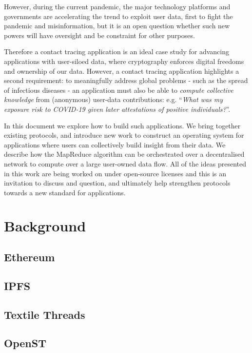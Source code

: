 \documentclass[twoside,twocolumn]{article}
\begin{document}
However, during the current pandemic, the major technology platforms and governments are accelerating the trend to exploit user data, first to fight the pandemic and misinformation, but it is an open question whether such new powers will have oversight and be constraint for other purposes.

Therefore a contact tracing application is an ideal case study for advancing applications with user-siloed data, where cryptography enforces digital freedoms and ownership of our data. However, a contact tracing application highlights a second requirement: to meaningfully address global problems - such as the spread of infectious diseases - an application must also be able to \emph{compute collective knowledge} from (anonymous) user-data contributions: e.g. ``\textit{What was my exposure risk to COVID-19 given later attestations of positive individuals?}''.

In this document we explore how to build such applications. We bring together existing protocols, and introduce new work to construct an operating system for applications where users can collectively build insight from their data. We describe how the MapReduce algorithm can be orchestrated over a decentralised network to compute over a large user-owned data flow. All of the ideas presented in this work are being worked on under open-source licenses and this is an invitation to discuss and question, and ultimately help strengthen protocols towards a new standard for applications.



\section{Background}

\subsection{Ethereum}

\subsection{IPFS}

\subsection{Textile Threads}

\subsection{OpenST}
\end{document}
